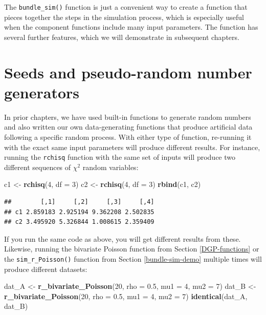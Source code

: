 \documentclass[
]{book}
\newenvironment{Shaded}{\begin{snugshade}}{\end{snugshade}}
\newcommand{\AttributeTok}[1]{\textcolor[rgb]{0.13,0.29,0.53}{#1}}
\newcommand{\DecValTok}[1]{\textcolor[rgb]{0.00,0.00,0.81}{#1}}
\newcommand{\FloatTok}[1]{\textcolor[rgb]{0.00,0.00,0.81}{#1}}
\newcommand{\FunctionTok}[1]{\textcolor[rgb]{0.13,0.29,0.53}{\textbf{#1}}}
\newcommand{\NormalTok}[1]{#1}
\newcommand{\OtherTok}[1]{\textcolor[rgb]{0.56,0.35,0.01}{#1}}
\begin{document}
The \texttt{bundle\_sim()} function is just a convenient way to create a function that pieces together the steps in the simulation process, which is especially useful when the component functions include many input parameters.
The function has several further features, which we will demonstrate in subsequent chapters.

\section{Seeds and pseudo-random number generators}\label{seeds-and-pseudo-RNGs}

In prior chapters, we have used built-in functions to generate random numbers and also written our own data-generating functions that produce artificial data following a specific random process.
With either type of function, re-running it with the exact same input parameters will produce different results.
For instance, running the \texttt{rchisq} function with the same set of inputs will produce two different sequences of \(\chi^2\) random variables:

\begin{Shaded}
\begin{Highlighting}[]
\NormalTok{c1 }\OtherTok{\textless{}{-}} \FunctionTok{rchisq}\NormalTok{(}\DecValTok{4}\NormalTok{, }\AttributeTok{df =} \DecValTok{3}\NormalTok{)}
\NormalTok{c2 }\OtherTok{\textless{}{-}} \FunctionTok{rchisq}\NormalTok{(}\DecValTok{4}\NormalTok{, }\AttributeTok{df =} \DecValTok{3}\NormalTok{)}
\FunctionTok{rbind}\NormalTok{(c1, c2)}
\end{Highlighting}
\end{Shaded}

\begin{verbatim}
##        [,1]     [,2]     [,3]     [,4]
## c1 2.859183 2.925194 9.362208 2.502835
## c2 3.495920 5.326844 1.008615 2.359409
\end{verbatim}

If you run the same code as above, you will get different results from these.
Likewise, running the bivariate Poisson function from Section \ref{DGP-functions} or the \texttt{sim\_r\_Poisson()} function from Section \ref{bundle-sim-demo} multiple times will produce different datasets:

\begin{Shaded}
\begin{Highlighting}[]
\NormalTok{dat\_A }\OtherTok{\textless{}{-}} \FunctionTok{r\_bivariate\_Poisson}\NormalTok{(}\DecValTok{20}\NormalTok{, }\AttributeTok{rho =} \FloatTok{0.5}\NormalTok{, }\AttributeTok{mu1 =} \DecValTok{4}\NormalTok{, }\AttributeTok{mu2 =} \DecValTok{7}\NormalTok{)}
\NormalTok{dat\_B }\OtherTok{\textless{}{-}} \FunctionTok{r\_bivariate\_Poisson}\NormalTok{(}\DecValTok{20}\NormalTok{, }\AttributeTok{rho =} \FloatTok{0.5}\NormalTok{, }\AttributeTok{mu1 =} \DecValTok{4}\NormalTok{, }\AttributeTok{mu2 =} \DecValTok{7}\NormalTok{)}
\FunctionTok{identical}\NormalTok{(dat\_A, dat\_B)}
\end{Highlighting}
\end{Shaded}
\end{document}
